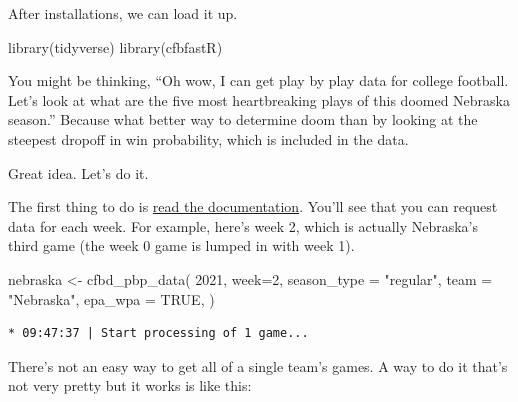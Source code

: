 \documentclass[
  letterpaper,
  DIV=11,
  numbers=noendperiod]{scrreprt}
\newenvironment{Shaded}{\begin{snugshade}}{\end{snugshade}}
\newcommand{\AttributeTok}[1]{\textcolor[rgb]{0.40,0.45,0.13}{#1}}
\newcommand{\ConstantTok}[1]{\textcolor[rgb]{0.56,0.35,0.01}{#1}}
\newcommand{\DecValTok}[1]{\textcolor[rgb]{0.68,0.00,0.00}{#1}}
\newcommand{\FunctionTok}[1]{\textcolor[rgb]{0.28,0.35,0.67}{#1}}
\newcommand{\NormalTok}[1]{\textcolor[rgb]{0.00,0.23,0.31}{#1}}
\newcommand{\OtherTok}[1]{\textcolor[rgb]{0.00,0.23,0.31}{#1}}
\newcommand{\StringTok}[1]{\textcolor[rgb]{0.13,0.47,0.30}{#1}}
\begin{document}
After installations, we can load it up.

\begin{Shaded}
\begin{Highlighting}[]
\FunctionTok{library}\NormalTok{(tidyverse)}
\FunctionTok{library}\NormalTok{(cfbfastR)}
\end{Highlighting}
\end{Shaded}

You might be thinking, ``Oh wow, I can get play by play data for college
football. Let's look at what are the five most heartbreaking plays of
this doomed Nebraska season.'' Because what better way to determine doom
than by looking at the steepest dropoff in win probability, which is
included in the data.

Great idea. Let's do it.

The first thing to do is
\href{https://saiemgilani.github.io/cfbfastR/reference/cfbd_pbp_data.html}{read
the documentation}. You'll see that you can request data for each week.
For example, here's week 2, which is actually Nebraska's third game (the
week 0 game is lumped in with week 1).

\begin{Shaded}
\begin{Highlighting}[]
\NormalTok{nebraska }\OtherTok{\textless{}{-}} \FunctionTok{cfbd\_pbp\_data}\NormalTok{(}
 \DecValTok{2021}\NormalTok{,}
  \AttributeTok{week=}\DecValTok{2}\NormalTok{, }
  \AttributeTok{season\_type =} \StringTok{"regular"}\NormalTok{,}
  \AttributeTok{team =} \StringTok{"Nebraska"}\NormalTok{,}
  \AttributeTok{epa\_wpa =} \ConstantTok{TRUE}\NormalTok{,}
\NormalTok{)}
\end{Highlighting}
\end{Shaded}

\begin{verbatim}
* 09:47:37 | Start processing of 1 game...
\end{verbatim}

There's not an easy way to get all of a single team's games. A way to do
it that's not very pretty but it works is like this:
\end{document}
